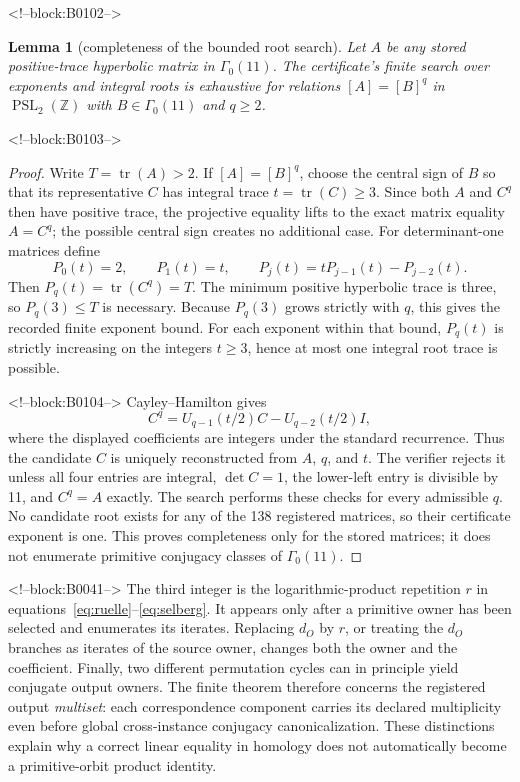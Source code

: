 \documentclass[11pt]{article}
\newtheorem{lemma}[theorem]{Lemma}
\theoremstyle{definition}
\theoremstyle{remark}
\newcommand{\G}{\Gamma_0(11)}
\begin{document}
<!--block:B0102-->
\begin{lemma}[completeness of the bounded root search]\label{lem:root-completeness}
Let $A$ be any stored positive-trace hyperbolic matrix in $\G$. The certificate's finite search over exponents and integral roots is exhaustive for relations $[A]=[B]^q$ in $\operatorname{PSL}_2(\mathbb Z)$ with $B\in\G$ and $q\geq2$.
\end{lemma}

<!--block:B0103-->
\begin{proof}
Write $T=\operatorname{tr}(A)>2$. If $[A]=[B]^q$, choose the central sign of $B$ so that its representative $C$ has integral trace $t=\operatorname{tr}(C)\geq3$. Since both $A$ and $C^q$ then have positive trace, the projective equality lifts to the exact matrix equality $A=C^q$; the possible central sign creates no additional case. For determinant-one matrices define
\[
P_0(t)=2,\qquad P_1(t)=t,\qquad
P_j(t)=tP_{j-1}(t)-P_{j-2}(t).
\]
Then $P_q(t)=\operatorname{tr}(C^q)=T$. The minimum positive hyperbolic trace is three, so $P_q(3)\leq T$ is necessary. Because $P_q(3)$ grows strictly with $q$, this gives the recorded finite exponent bound. For each exponent within that bound, $P_q(t)$ is strictly increasing on the integers $t\geq3$, hence at most one integral root trace is possible.

<!--block:B0104-->
Cayley--Hamilton gives
\[
C^q=U_{q-1}(t/2)C-U_{q-2}(t/2)I,
\]
where the displayed coefficients are integers under the standard recurrence. Thus the candidate $C$ is uniquely reconstructed from $A$, $q$, and $t$. The verifier rejects it unless all four entries are integral, $\det C=1$, the lower-left entry is divisible by 11, and $C^q=A$ exactly. The search performs these checks for every admissible $q$. No candidate root exists for any of the 138 registered matrices, so their certificate exponent is one. This proves completeness only for the stored matrices; it does not enumerate primitive conjugacy classes of $\G$.
\end{proof}

<!--block:B0041-->
The third integer is the logarithmic-product repetition $r$ in equations~\eqref{eq:ruelle}--\eqref{eq:selberg}. It appears only after a primitive owner has been selected and enumerates its iterates. Replacing $d_O$ by $r$, or treating the $d_O$ branches as iterates of the source owner, changes both the owner and the coefficient. Finally, two different permutation cycles can in principle yield conjugate output owners. The finite theorem therefore concerns the registered output \emph{multiset}: each correspondence component carries its declared multiplicity even before global cross-instance conjugacy canonicalization. These distinctions explain why a correct linear equality in homology does not automatically become a primitive-orbit product identity.
\end{document}
